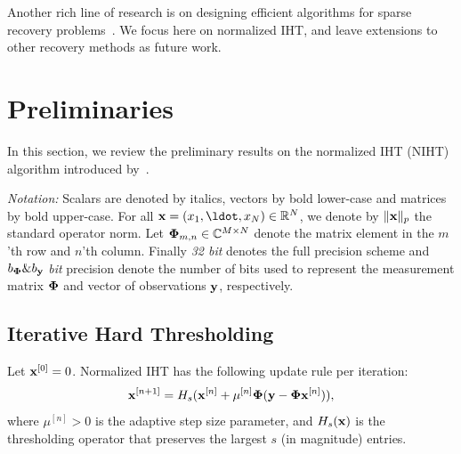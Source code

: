 \documentclass[aoas,preprint]{imsart}
\numberwithin{equation}{section}
\theoremstyle{plain}
\begin{document}

Another rich line of research is on 
designing efficient algorithms for sparse recovery problems~\cite{blumensath2011aiht, wei2015fiht, blanchard2013iht, cevher2011ht, liu2017dualiht}. We focus here on normalized IHT, and leave extensions to other recovery methods as future work.




\section{Preliminaries}\label{section_iht}

In this section, we review the preliminary results on the normalized IHT (NIHT) algorithm introduced by~\cite{blumensath2010niht, blumensath2012greedy}.
\vspace{0.5em}

{\it Notation:} Scalars are denoted by italics, vectors by bold lower-case and matrices by bold upper-case. For all ${\bf x}= (x_1, \ldot, x_N) \in \mathbb{R}^N$, we denote by $\|{\bf x}\|_p$ the standard operator norm. Let ${\bf \Phi}_{m, n}\in \mathbb{C}^{M\times N}$ denote the matrix element in the $m$'th row and $n$'th column. Finally {\it 32 bit} denotes the full precision scheme and $b_{\bf \Phi}\&b_{\bf y}$ {\it bit} precision denote the number of bits used to represent the measurement matrix ${\bf \Phi}$ and vector of observations ${\bf y}$, respectively.
\subsection{Iterative Hard Thresholding} 
Let ${\bf x}^{[0]} = 0$. Normalized IHT has the following update rule per iteration: 
\begin{equation}\label{iht_update_rule}
{\bf x}^{[n+1]} = H_s({\bf x}^{[n]} + \mu^{[n]}{\bf \Phi}({\bf y}-{\bf \Phi}{\bf x}^{[n]})),
\end{equation}
where $\mu^{[n]}>0$ is the adaptive step size parameter, and $H_s({\bf x})$ is the
thresholding operator that preserves the largest $s$ (in magnitude) entries.
\end{document}
